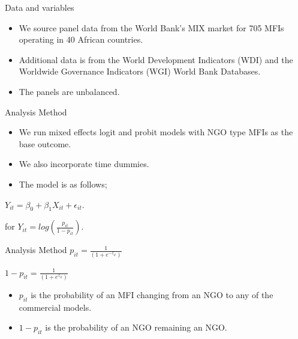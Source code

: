 \documentclass[
  ignorenonframetext,
]{beamer}
\begin{document}
\begin{frame}{Data and variables}
\protect\hypertarget{data-and-variables}{}
\begin{itemize}
\item
  We source panel data from the World Bank's MIX market for 705 MFIs
  operating in 40 African countries.
\item
  Additional data is from the World Development Indicators (WDI) and the
  Worldwide Governance Indicators (WGI) World Bank Databases.
\item
  The panels are unbalanced.
\end{itemize}
\end{frame}

\begin{frame}{Analysis Method}
\protect\hypertarget{analysis-method}{}
\begin{itemize}
\item
  We run mixed effects logit and probit models with NGO type MFIs as the
  base outcome.
\item
  We also incorporate time dummies.
\item
  The model is as follows;
\end{itemize}

\(Y_{it} = \beta_{0} + \beta_{1}X_{it} + \epsilon_{it}\).

for \(Y_{it} = log(\frac{p_{it}}{1 - p_{it}})\).
\end{frame}

\begin{frame}{Analysis Method}
\protect\hypertarget{analysis-method-1}{}
\(p_{it} = \frac{1}{(1 + e^{-z_{it}})}\)

\(1 - p_{it} = \frac{1}{(1 + e^{z_{it}})}\)

\begin{itemize}
\item
  \(p_{it}\) is the probability of an MFI changing from an NGO to any of
  the commercial models.
\item
  \(1 - p_{it}\) is the probability of an NGO remaining an NGO.
\end{itemize}
\end{frame}
\end{document}
